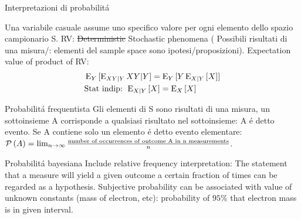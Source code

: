 \begin{frame}{Interpretazioni di probabilit\'a}
\begin{block}{Una variabile casuale assume uno specifico valore per ogni elemento dello spazio campionario S.}
RV: \sout{Deterministic} Stochastic phenomena ( Possibili risultati di una misura/: elementi del sample space sono ipotesi/proposizioni). Expectation value of product of RV:%
\begin{align*}
&\operatorname{E}_Y{[\operatorname{E}_{XY|Y}{XY|Y}]}=\operatorname{E}_Y{[Y\operatorname{E}_{X|Y}{[X]}]}\\
&\text{Stat indip: }\operatorname{E}_{X|Y}{[X]}=\operatorname{E}_X{[X]}
\end{align*}
\end{block}
\begin{block}{Probabilit\'a frequentista}
Gli elementi di S sono risultati di una misura, un sottoinsieme A corrisponde a qualsiasi risultato nel sottoinsieme: A \'e detto evento. Se A contiene solo un elemento \'e detto evento elementare: $\operatorname{\mathcal{P}}{(A)}=\lim_{n\to\infty}\frac{\text{number of occurrences of outcome A in n measurements}}{n}$.
\end{block}
\begin{block}{Probabilit\'a bayesiana}
Include relative frequency interpretation: The statement that a measure will yield a given outcome a certain fraction of times can be regarded as a hypothesis.
Subjective probability can be associated with value of unknown constants (mass of electron, etc): probability of $95\%$ that electron mass is in given interval.
\end{block}
\end{frame}

